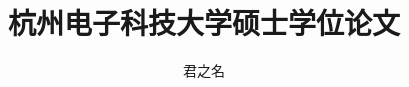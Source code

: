 \documentclass[master, oneside]{hduthesis} %
\title{杭州电子科技大学硕士学位论文} %
\author{君之名}
\institute{计算机学院学院}         %
\begin{document}
\maketitle

\abstractmatter



\tableofcontents %
%

\mainmatter



\backmatter





%

%
\end{document}
